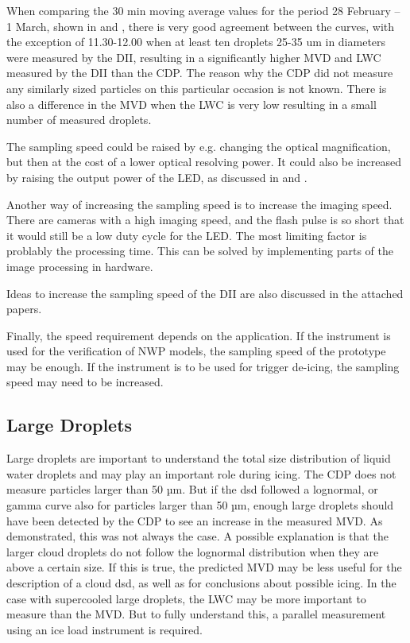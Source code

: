 When comparing the 30 min moving average values for the period 28 February -- 1 March, shown in  and , there is very good agreement between the curves, with the exception of 11.30-12.00 when at least ten droplets 25-35 um in diameters were measured by the DII, resulting in a significantly higher MVD and LWC measured by the DII than the CDP. The reason why the CDP did not measure any similarly sized particles on this particular occasion is not known. There is also a difference in the MVD when the LWC is very low resulting in a small number of measured droplets.

The sampling speed could be raised by e.g. changing the optical magnification, but then at the cost of a lower optical resolving power. It could also be increased by raising the output power of the LED, as discussed in  and . 

Another way of increasing the sampling speed is to increase the imaging speed. There are cameras with a high imaging speed, and the flash pulse is so short that it would still be a low duty cycle for the LED. The most limiting factor is problably the processing time. This can be solved by implementing parts of the image processing in hardware.

Ideas to increase the sampling speed of the DII are also discussed in the attached papers. 

Finally, the speed requirement depends on the application. If the instrument is used for the verification of NWP models, the sampling speed of the prototype may be enough. If the instrument is to be used for trigger de-icing, the sampling speed may need to be increased.

\subsection{Large Droplets}

Large droplets are important to understand the total size distribution of liquid water droplets and may play an important role during icing. The CDP does not measure particles larger than 50 µm. But if the \gls{dsd} followed a lognormal, or gamma curve \cite{miles2000,lee2010} also for particles larger than 50 µm, enough large droplets should have been detected by the CDP to see an increase in the measured MVD. As demonstrated, this was not always the case. A possible explanation is that the larger cloud droplets do not follow the lognormal distribution when they are above a certain size. If this is true, the predicted MVD may be less useful for the description of a cloud \gls{dsd}, as well as for conclusions about possible icing. In the case with supercooled large droplets, the LWC may be more important to measure than the MVD. But to fully understand this, a parallel measurement using an ice load instrument is required.

